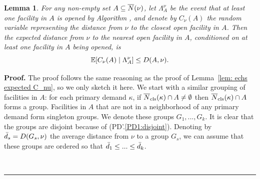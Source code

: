 \documentclass[oneside,final]{ucr}
\newtheorem{lemma}[theorem]{Lemma}
\newenvironment{proof}[1][Proof]{\textbf{#1.} }{\ \rule{0.5em}{0.5em}}
\begin{document}
\begin{lemma}\label{lem: expected distance in EBGS}
  For any non-empty set $A\subseteq {\overline{N}}(\nu)$, let $\Lambda^\nu_A$ be
  the event that at least one facility in $A$ is opened by Algorithm
  {\EBGS}, and denote by $C_\nu(A)$ the random variable representing
  the distance from $\nu$ to the closest open facility in $A$.  Then
  the expected distance from $\nu$ to the nearest open facility in
  $A$, conditioned on at least one facility in $A$ being opened, is
%
\begin{equation*}
	\mathbb{E}[C_\nu(A) \mid \Lambda^\nu_A ] \le D(A,\nu).
\end{equation*}
\end{lemma}
\begin{proof}
  The proof follows the same reasoning as the proof of Lemma~\ref{lem:
    echs expected C_nu}, so we only sketch it here. We start with a
  similar grouping of facilities in $A$: for each primary demand
  $\kappa$, if ${\overline{N}}_{{\mbox{\scriptsize\rm cls}}}(\kappa)\cap A\neq\emptyset$ then
  ${\overline{N}}_{{\mbox{\scriptsize\rm cls}}}(\kappa)\cap A$ forms a group. Facilities in $A$ that are
  not in a neighborhood of any primary demand form singleton groups.
  We denote these groups $G_1,...,G_k$. It is clear that the groups
  are disjoint because of (PD'.\ref{PD1:disjoint}). Denoting by
  ${\bar d}_s = D(G_s, \nu)$ the average distance from $\nu$ to a group $G_s$, we
  can assume that these groups are ordered so that ${\bar d}_1\le ... \le
  {\bar d}_k$.


\end{proof}
\end{document}
